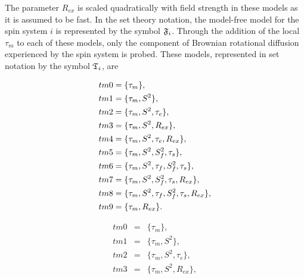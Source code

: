 \begin{htmlonly}
\begin{htmlonly}
\noindent The parameter $R_{ex}$ is scaled quadratically with field strength in these models as it is assumed to be fast.
In the set theory notation, the model-free model for the spin system $i$ is represented by the symbol $\mathfrak{F}_i$.
Through the addition of the local $\tau_m$ to each of these models, only the component of Brownian rotational diffusion experienced by the spin system is probed.
These models, represented in set notation by the symbol $\mathfrak{T}_i$, are
\begin{latexonly}
\begin{subequations}
\renewcommand{\theequation}{\theparentequation .\arabic{equation}}
\addtocounter{equation}{-1}
\begin{align}
 tm0 &= \{\tau_m\},                                     \label{model: tm0} \\
 tm1 &= \{\tau_m, S^2\},                                \label{model: tm1} \\
 tm2 &= \{\tau_m, S^2, \tau_e\},                        \label{model: tm2} \\
 tm3 &= \{\tau_m, S^2, R_{ex}\},                        \label{model: tm3} \\
 tm4 &= \{\tau_m, S^2, \tau_e, R_{ex}\},                \label{model: tm4} \\
 tm5 &= \{\tau_m, S^2, S^2_f, \tau_s\},                 \label{model: tm5} \\
 tm6 &= \{\tau_m, S^2, \tau_f, S^2_f, \tau_s\},         \label{model: tm6} \\
 tm7 &= \{\tau_m, S^2, S^2_f, \tau_s, R_{ex}\},         \label{model: tm7} \\
 tm8 &= \{\tau_m, S^2, \tau_f, S^2_f, \tau_s, R_{ex}\}, \label{model: tm8} \\
 tm9 &= \{\tau_m, R_{ex}\}.                             \label{model: tm9}
\end{align}
\end{subequations}
\end{latexonly}
\begin{htmlonly}
\begin{eqnarray}
 tm0 &=& \{\tau_m\},                                     \label{model: tm0} \\
 tm1 &=& \{\tau_m, S^2\},                                \label{model: tm1} \\
 tm2 &=& \{\tau_m, S^2, \tau_e\},                        \label{model: tm2} \\
 tm3 &=& \{\tau_m, S^2, R_{ex}\},                        \label{model: tm3} \\

\end{eqnarray}
\end{htmlonly}
\end{htmlonly}
\end{htmlonly}
